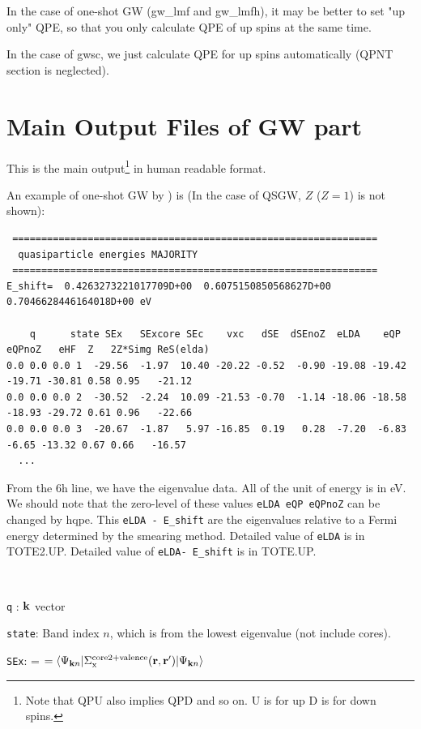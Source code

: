{In the case of one-shot GW (gw\_lmf and gw\_lmfh),
it may be better to set "up only" QPE,
so that you only calculate QPE of up spins at the same time.

In the case of gwsc, we just calculate QPE for up spins
automatically (QPNT section is neglected).



\newpage
\section{Main Output Files of GW part}
\label{mainoutputgw}
This is the main output\footnote{Note that QPU also implies QPD and so
on. U is for up D is for down spins.} in 
human readable format. 

An example of one-shot GW by ) is 
(In the case of QSGW, $Z$ ($Z=1$) is not shown):
{\baselineskip=2.6mm \small
\begin{verbatim} 
 ===============================================================
  quasiparticle energies MAJORITY
 ===============================================================
E_shift=  0.4263273221017709D+00  0.6075150850568627D+00  0.7046628446164018D+00 eV

    q      state SEx   SExcore SEc    vxc   dSE  dSEnoZ  eLDA    eQP  eQPnoZ   eHF  Z   2Z*Simg ReS(elda)
0.0 0.0 0.0 1  -29.56  -1.97  10.40 -20.22 -0.52  -0.90 -19.08 -19.42 -19.71 -30.81 0.58 0.95   -21.12
0.0 0.0 0.0 2  -30.52  -2.24  10.09 -21.53 -0.70  -1.14 -18.06 -18.58 -18.93 -29.72 0.61 0.96   -22.66
0.0 0.0 0.0 3  -20.67  -1.87   5.97 -16.85  0.19   0.28  -7.20  -6.83  -6.65 -13.32 0.67 0.66   -16.57
  ...
\end{verbatim}}
From the 6h line, we have the eigenvalue data. All of the unit of energy is in eV.
We should note that the zero-level of these values {\tt eLDA  eQP eQPnoZ} can be changed  by hqpe.
This {\tt eLDA - E\_shift} are the eigenvalues relative to a Fermi energy determined by the smearing method.
Detailed value of {\tt eLDA} is in {\sf TOTE2.UP}.
Detailed value of {\tt eLDA- E\_shift} is in {\sf TOTE.UP}.

\ 

{\tt q}  : ${\bf k}$ vector

{\tt state}: Band index $n$, which is from the lowest eigenvalue (not include cores).

{\tt SEx}: = $= \langle\Psi_{{\bf k}n}|\Sigma_{\rm x}^{\rm core2+valence}({\bf r},{\bf r}^{\prime})|\Psi_{{\bf k}n}\rangle$

}
